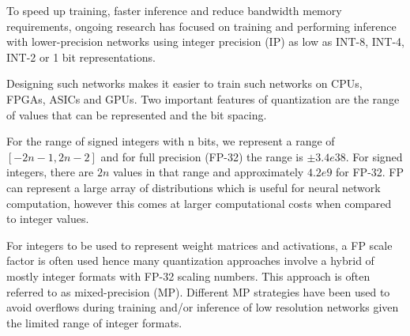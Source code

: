 To speed up training, faster inference and reduce bandwidth memory requirements,
ongoing research has focused on training and performing inference with lower-precision
networks using integer precision (IP) as low as INT-8, INT-4, INT-2 or 1 bit
representations.

Designing such networks makes it easier to train such networks on CPUs, FPGAs,
ASICs and GPUs. Two important features of quantization are the range of values
that can be represented and the bit spacing.

For the range of signed integers with n bits, we represent a range of $[-2n-1, 2n-2]$
and for full precision (FP-32) the range is $\pm3.4e38$. For signed integers,
there are $2n$ values in that range and approximately $4.2e9$ for FP-32. FP can
represent a large array of distributions which is useful for neural network
computation, however this comes at larger computational costs when compared
to integer values.

For integers to be used to represent weight matrices and activations, a FP scale
factor is often used hence many quantization approaches involve a hybrid of mostly
integer formats with FP-32 scaling numbers. This approach is often referred to
as mixed-precision (MP). Different MP strategies have been used to avoid overflows
during training and/or inference of low resolution networks given the
limited range of integer formats.
